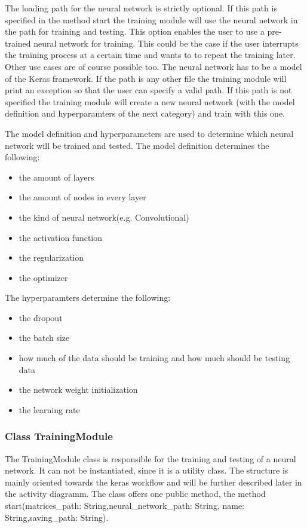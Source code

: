 \documentclass[parskip=full]{scrartcl}
\begin{document}
The loading path for the \gls{neural network} is strictly optional.
If this path is specified in the method start the training module will use the \gls{neural network} in the path for training and testing.
This option enables the user to use a pre-trained \gls{neural network} for training.
This could be the case if the user interrupts the training process at a certain time and wants to to repeat the training later.
Other use cases are of course possible too.
The \gls{neural network} has to be a model of the Keras framework.
If the path is any other file the training module will print an exception so that the user can specify a valid path.
If this path is not specified the training module will create a new \gls{neural network} (with the model definition and hyperparamters of the next category) and train with this one. \newline

The model definition and hyperparameters are used to determine which \gls{neural network} will be trained and tested.
The model definition determines the following:
\begin{itemize}
\item the amount of layers
\item the amount of nodes in every layer
\item the kind of \gls{neural network}(e.g. Convolutional)
\item the activation function
\item the regularization
\item the optimizer
\end{itemize}

The hyperparamters determine the following:

\begin{itemize}
\item the dropout
\item the batch size
\item how much of the data should be training and how much should be testing data
\item the network weight initialization
\item the learning rate
\end{itemize}

\subsubsection{Class TrainingModule}
The TrainingModule class is responsible for the training and testing of a \gls{neural network}.
It can not be instantiated, since it is a utility class.
The structure is mainly oriented towards the keras workflow and will be further described later in the activity diagramm.
The class offers one public method, the method start(matrices\_path: String,neural\_network\_path: String,
name: String,saving\_path: String). \newline
\end{document}
